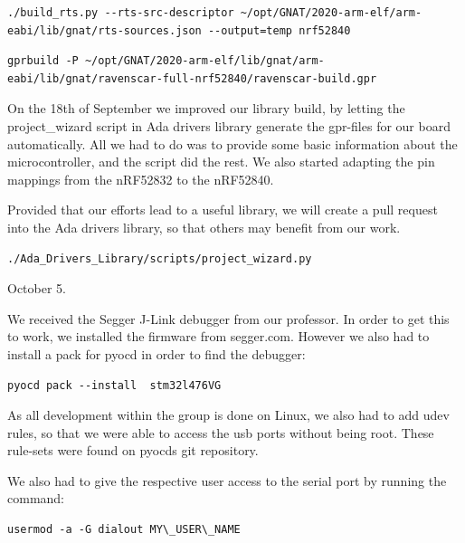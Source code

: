 \documentclass{article}
\begin{document}

\begin{lstlisting}
./build_rts.py --rts-src-descriptor ~/opt/GNAT/2020-arm-elf/arm-eabi/lib/gnat/rts-sources.json --output=temp nrf52840
\end{lstlisting}

\begin{lstlisting}
gprbuild -P ~/opt/GNAT/2020-arm-elf/lib/gnat/arm-eabi/lib/gnat/ravenscar-full-nrf52840/ravenscar-build.gpr
\end{lstlisting}


\vspace{5mm}
On the 18th of September we improved our library build, by letting the project\_wizard script in Ada drivers library generate the gpr-files for our board automatically. All we had to do was to provide some basic information about the microcontroller, and the script did the rest. We also started adapting the pin mappings from the nRF52832 to the nRF52840. 

Provided that our efforts lead to a useful library, we will create a pull request into the Ada drivers library, so that others may benefit from our work. 

\begin{lstlisting}
./Ada_Drivers_Library/scripts/project_wizard.py
\end{lstlisting}

\vspace{5mm}

October 5. 

We received the Segger J-Link debugger from our professor. In order to get this to work, we installed the firmware from segger.com. However we also had to install a pack for pyocd in order to find the debugger:


\begin{lstlisting}
pyocd pack --install  stm32l476VG
\end{lstlisting}

As all development within the group is done on Linux, we also had to add udev rules, so that we were able to access the usb ports without being root. These rule-sets were found on pyocds git repository.

We also had to give the respective user access to the serial port by running the command: 
\begin{lstlisting}
usermod -a -G dialout MY\_USER\_NAME
\end{lstlisting}
\end{document}
